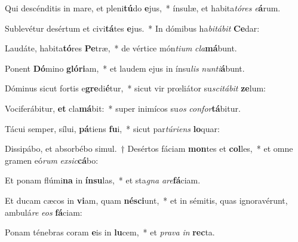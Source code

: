 \item Qui descénditis in mare, et pleni\textbf{tú}do \textbf{e}jus,~* ínsulæ, et habita\textit{tó}\textit{res} \textit{e}\textbf{á}rum.
\item Sublevétur desértum et civi\textbf{tá}tes \textbf{e}jus.~* In dómibus ha\textit{bi}\textit{tá}\textit{bit} \textbf{Ce}dar:
\item Laudáte, habita\textbf{tó}res \textbf{Pe}træ,~* de vértice món\textit{ti}\textit{um} \textit{cla}\textbf{má}bunt.
\item Ponent \textbf{Dó}mino \textbf{gló}\textbf{ri}am,~* et laudem ejus in ínsu\textit{lis} \textit{nun}\textit{ti}\textbf{á}bunt.
\item Dóminus sicut fortis e\textbf{gre}di\textbf{é}tur,~* sicut vir prœliátor su\textit{sci}\textit{tá}\textit{bit} \textbf{ze}lum:
\item Vociferábitur, \textbf{et} cla\textbf{má}bit:~* super inimícos su\textit{os} \textit{con}\textit{for}\textbf{tá}bitur.
\item Tácui semper, sílui, \textbf{pá}tiens \textbf{fu}i,~* sicut par\textit{tú}\textit{ri}\textit{ens} \textbf{lo}quar:
\item Dissipábo, et absorbébo simul.~† Desértos fáciam \textbf{mon}tes et \textbf{col}les,~* et omne gramen eó\textit{rum} \textit{ex}\textit{sic}\textbf{cá}bo:
\item Et ponam flúmi\textbf{na} in \textbf{ín}\textbf{su}las,~* et sta\textit{gna} \textit{a}\textit{re}\textbf{fá}ciam.
\item Et ducam cæcos in \textbf{vi}am, quam \textbf{né}\textbf{sci}unt,~* et in sémitis, quas ignoravérunt, ambulá\textit{re} \textit{e}\textit{os} \textbf{fá}ciam:
\item Ponam ténebras coram \textbf{e}is in \textbf{lu}cem,~* et \textit{pra}\textit{va} \textit{in} \textbf{rec}ta.
